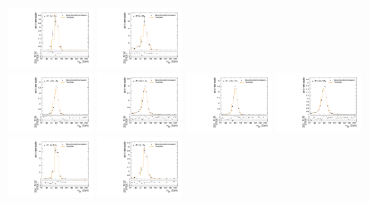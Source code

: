 \begin{figure}[htpb]
  \includegraphics[width=0.2\textwidth]{fig/analysisAppendix/templateVsReco_RadToWW2000_r0_MJ_mu_HP_bb_HDy.pdf}
  \includegraphics[width=0.2\textwidth]{fig/analysisAppendix/templateVsReco_RadToWW2000_r0_MJ_mu_LP_bb_HDy.pdf}\\
  \includegraphics[width=0.2\textwidth]{fig/analysisAppendix/templateVsReco_RadToWW2000_r0_MJ_mu_HP_nobb_LDy.pdf}
  \includegraphics[width=0.2\textwidth]{fig/analysisAppendix/templateVsReco_RadToWW2000_r0_MJ_mu_LP_nobb_LDy.pdf}
  \includegraphics[width=0.2\textwidth]{fig/analysisAppendix/templateVsReco_RadToWW2000_r0_MJ_mu_HP_nobb_HDy.pdf}
  \includegraphics[width=0.2\textwidth]{fig/analysisAppendix/templateVsReco_RadToWW2000_r0_MJ_mu_LP_nobb_HDy.pdf}\\
  \includegraphics[width=0.2\textwidth]{fig/analysisAppendix/templateVsReco_RadToWW2000_r0_MJ_mu_HP_vbf_LDy.pdf}
  \includegraphics[width=0.2\textwidth]{fig/analysisAppendix/templateVsReco_RadToWW2000_r0_MJ_mu_LP_vbf_LDy.pdf}

\end{figure}
